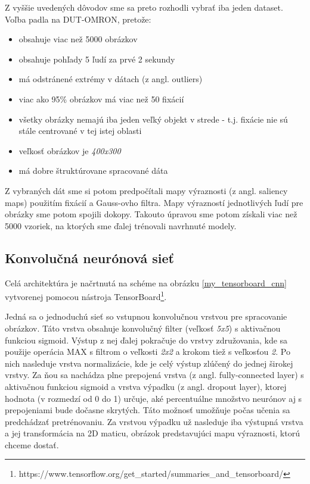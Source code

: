 Z vyššie uvedených dôvodov sme sa preto rozhodli vybrať iba jeden dataset. Voľba padla na DUT-OMRON\cite{dut-omron}, pretože:
\begin{itemize}
	\item obsahuje viac než 5000 obrázkov
	\item obsahuje pohľady 5 ľudí za prvé 2 sekundy
	\item má odstránené extrémy v dátach (z angl. outliers)
	\item viac ako 95\% obrázkov má viac než 50 fixácií
	\item všetky obrázky nemajú iba jeden veľký objekt v strede - t.j. fixácie nie sú stále centrované v tej istej oblasti
	\item veľkosť obrázkov je \textit{400x300}
	\item má dobre štruktúrovane spracované dáta
\end{itemize} 

Z vybraných dát sme si potom predpočítali mapy výraznosti (z angl. saliency maps) použitím fixácií a Gauss-ovho filtra. Mapy výrazností jednotlivých ľudí pre obrázky sme potom spojili dokopy. Takouto úpravou sme potom získali viac než 5000 vzoriek, na ktorých sme ďalej trénovali navrhnuté modely.

\subsection{Konvolučná neurónová sieť}
\label{nn_popis}

Celá architektúra je načrtnutá na schéme na obrázku \ref{my_tensorboard_cnn} vytvorenej pomocou nástroja  TensorBoard\footnote{https://www.tensorflow.org/get\_started/summaries\_and\_tensorboard/}.

Jedná sa o jednoduchú sieť so vstupnou konvolučnou vrstvou pre spracovanie obrázkov. Táto vrstva obsahuje konvolučný filter (veľkosť \textit{5x5}) s aktivačnou funkciou sigmoid. Výstup z nej ďalej pokračuje do vrstvy združovania, kde sa použije operácia MAX s filtrom o veľkosti \textit{2x2} a krokom tiež s veľkosťou \textit{2}. Po nich nasleduje vrstva normalizácie, kde je celý výstup zlúčený do jednej širokej vrstvy. Za ňou sa nachádza plne prepojená vrstva (z angl. fully-connected layer) s aktivačnou funkciou sigmoid a vrstva výpadku (z angl. dropout layer\cite{dropout}), ktorej hodnota (v rozmedzí od 0 do 1) určuje, aké percentuálne množstvo neurónov aj s prepojeniami bude dočasne skrytých. Táto možnosť umožňuje počas učenia sa predchádzať pretrénovaniu. Za vrstvou výpadku už nasleduje iba výstupná vrstva a jej transformácia na 2D maticu, obrázok predstavujúci mapu výraznosti, ktorú chceme dostať.

